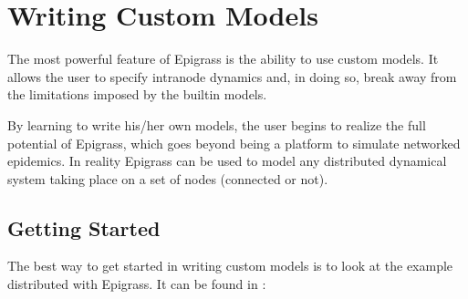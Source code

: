 \documentclass[letterpaper,10pt,english]{sphinxmanual}
\begin{document}
\chapter{Writing Custom Models}
\label{\detokenize{scripting:writing-custom-models}}\label{\detokenize{scripting:custom}}\label{\detokenize{scripting::doc}}
\ignorespaces 
The most powerful feature of Epigrass is the ability to use custom
models. It allows the user to specify intra\sphinxhyphen{}node dynamics and, in
doing so, break away from the limitations imposed by the built\sphinxhyphen{}in
models.

By learning to write his/her own models, the user begins to realize
the full potential of Epigrass, which goes beyond being a platform to
simulate networked epidemics. In reality Epigrass can be used to model
any distributed dynamical system taking place on a set of nodes
(connected or not).


\section{Getting Started}
\label{\detokenize{scripting:getting-started}}
The best way to get started in writing custom models is to look at the
example distributed with Epigrass. It can be found in
:
\end{document}
